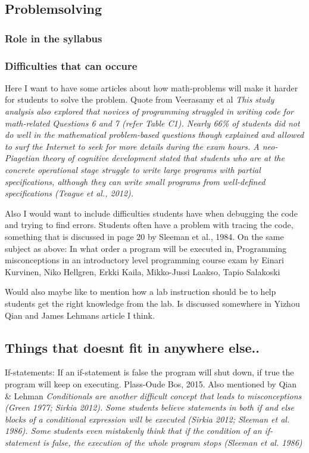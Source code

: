 \documentclass[twocolumn]{article}
\begin{document}
\subsection{Problemsolving}

\subsubsection{Role in the syllabus}

\subsubsection{Difficulties that can occure}


Here I want to have some articles about how math-problems will make it harder for students to solve the problem. Quote from Veerasamy et al \emph{This study analysis also explored that novices of programming struggled in writing code for math-related Questions 6 and 7 (refer Table C1). Nearly 66\% of students did not do well in the mathematical problem-based questions though explained and allowed to surf the Internet to seek for more details during the exam hours. A neo-Piagetian theory of cognitive development stated that students who are at the concrete operational stage struggle to write large programs with partial specifications, although they can write small programs from well-defined specifications (Teague et al., 2012).}

Also I would want to include difficulties students have when debugging the code and trying to find errors. Students often have a problem with tracing the code, something that is discussed in page 20 by Sleeman et al., 1984. 
On the same subject as above: In what order a program will be executed in, Programming misconceptions in an introductory level programming course exam by Einari Kurvinen, Niko Hellgren, Erkki Kaila, Mikko-Jussi Laakso, Tapio Salakoski

Would also maybe like to mention how a lab instruction should be to help students get the right knowledge from the lab. Is discussed somewhere in Yizhou Qian and James Lehmans article I think.

\subsection{Things that doesnt fit in anywhere else..}

If-statements: If an if-statement is false the program will shut down, if true the program will keep on executing. Plass-Oude Bos, 2015. Also mentioned by Qian \& Lehman \emph{Conditionals are another difficult concept that leads to misconceptions (Green 1977; Sirkia 2012). Some students believe statements in both if and else blocks of a conditional expression will be executed (Sirkia 2012; Sleeman et al. 1986). Some students even mistakenly think that if the condition of an if-statement is false, the execution of the whole program stops (Sleeman et al. 1986)}
\end{document}
